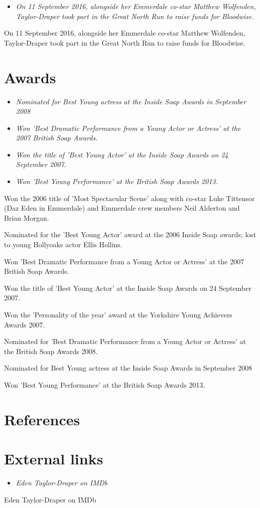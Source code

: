 \begin{itemize}
\item
  \emph{On 11 September 2016, alongside her Emmerdale co-star Matthew
  Wolfenden, Taylor-Draper took part in the Great North Run to raise
  funds for Bloodwise.}
\end{itemize}

On 11 September 2016, alongside her Emmerdale co-star Matthew Wolfenden,
Taylor-Draper took part in the Great North Run to raise funds for
Bloodwise.

\section{Awards}\label{awards}

\begin{itemize}
\item
  \emph{Nominated for Best Young actress at the Inside Soap Awards in
  September 2008}
\item
  \emph{Won 'Best Dramatic Performance from a Young Actor or Actress' at
  the 2007 British Soap Awards.}
\item
  \emph{Won the title of 'Best Young Actor' at the Inside Soap Awards on
  24 September 2007.}
\item
  \emph{Won 'Best Young Performance' at the British Soap Awards 2013.}
\end{itemize}

Won the 2006 title of 'Most Spectacular Scene' along with co-star Luke
Tittensor (Daz Eden in Emmerdale) and Emmerdale crew members Neil
Alderton and Brian Morgan.

Nominated for the 'Best Young Actor' award at the 2006 Inside Soap
awards; lost to young Hollyoaks actor Ellis Hollins.

Won 'Best Dramatic Performance from a Young Actor or Actress' at the
2007 British Soap Awards.

Won the title of 'Best Young Actor' at the Inside Soap Awards on 24
September 2007.

Won the 'Personality of the year' award at the Yorkshire Young Achievers
Awards 2007.

Nominated for 'Best Dramatic Performance from a Young Actor or Actress'
at the British Soap Awards 2008.

Nominated for Best Young actress at the Inside Soap Awards in September
2008

Won 'Best Young Performance' at the British Soap Awards 2013.

\section{References}\label{references}

\section{External links}\label{external-links}

\begin{itemize}
\item
  \emph{Eden Taylor-Draper on IMDb}
\end{itemize}

Eden Taylor-Draper on IMDb
